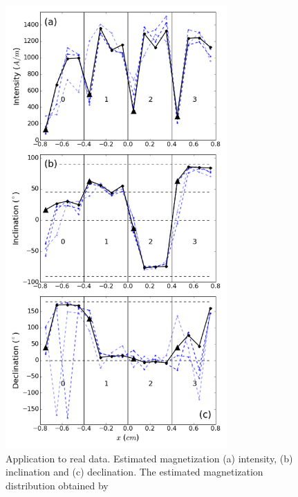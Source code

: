 \documentclass[draft,gc]{agutex}
\begin{document}
 \begin{figure}
 \noindent \includegraphics[width=20pc]{Figs/Fig15_LQ.png}
 \caption{Application to real data. Estimated magnetization 
 (a) intensity, (b) inclination and (c) declination.
 The estimated magnetization distribution obtained by 
}
\end{figure}
\end{document}

